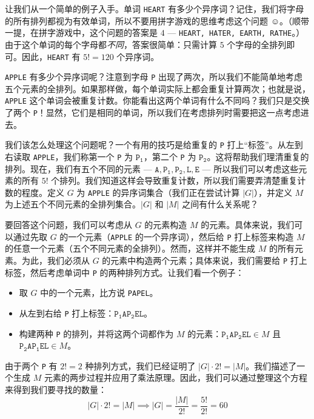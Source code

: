 \begin{example}
    让我们从一个简单的例子入手。单词 \verb|HEART| 有多少个异序词？记住，我们将字母的所有排列都视为有效单词，所以不要用拼字游戏的思维考虑这个问题 $\smiley{}$。（顺带一提，在拼字游戏中，这个问题的答案是 $4$ --- \verb|HEART, HATER, EARTH, RATHE|。）由于这个单词的每个字母都\emph{不同}，答案很简单：只需计算 $5$ 个字母的全排列即可。因此，\verb|HEART| 有 $5! = 120$ 个异序词。

    \verb|APPLE| 有多少个异序词呢？注意到字母 \verb|P| 出现了两次，所以我们不能简单地考虑五个元素的全排列。如果那样做，每个单词实际上都会重复计算两次；也就是说，\verb|APPLE| 这个单词会被重复计数。你能看出这两个单词有什么不同吗？我们只是交换了两个 \verb|P|！显然，它们是相同的单词，所以我们在考虑排列时需要把这一点考虑进去。

    我们该怎么处理这个问题呢？一个有用的技巧是给重复的 \verb|P| 打上``标签''。从左到右读取 \verb|APPLE|，我们称第一个 \verb|P| 为 $\mathtt{P_1}$，第二个 \verb|P| 为 $\mathtt{P_2}$。这将帮助我们理清重复的排列。现在，我们有五个不同的元素 --- $\mathtt{A, P_1, P_2, L, E}$ --- 所以我们可以考虑这些元素的所有 $5!$ 个排列。我们知道这样会导致重复计数，所以我们需要弄清楚重复计数的程度。定义 $G$ 为 \verb|APPLE| 的异序词集合（我们正在尝试计算 $|G|$），并定义 $M$ 为上述五个不同元素的全排列集合。$|G|$ 和 $|M|$ 之间有什么关系呢？

    要回答这个问题，我们可以考虑从 $G$ 的元素构造 $M$ 的元素。具体来说，我们可以通过先取 $G$ 的一个元素（\verb|APPLE| 的一个异序词），然后给 \verb|P| 打上标签来构造 $M$ 的任意一个元素（五个不同元素的全排列）。然而，这样并不能生成 $M$ 的所有元素。为此，我们必须从 $G$ 的元素中构造两个元素；具体来说，我们需要给 \verb|P| 打上标签，然后考虑单词中 \verb|P| 的两种排列方式。让我们看一个例子：
    \begin{itemize}
        \item 取 $G$ 中的一个元素，比方说 \verb|PAPEL|。
        \item 从左到右给 \verb|P| 打上标签：$\mathtt{P_1AP_2EL}$。
        \item 构建两种 \verb|P| 的排列，并将这两个词都作为 $M$ 的元素：$\mathtt{P_1AP_2EL} \in M$ 且 $\mathtt{P_2AP_1EL} \in M$。
    \end{itemize}
    由于两个 \verb|P| 有 $2! = 2$ 种排列方式，我们已经证明了 $|G| \cdot 2! = |M|$。我们描述了一个生成 $M$ 元素的两步过程并应用了乘法原理。因此，我们可以通过整理这个方程来得到我们要寻找的数量：
    \[|G| \cdot 2! = |M| \implies |G| = \frac{|M|}{2!} = \frac{5!}{2!} = 60\]


\end{example}
